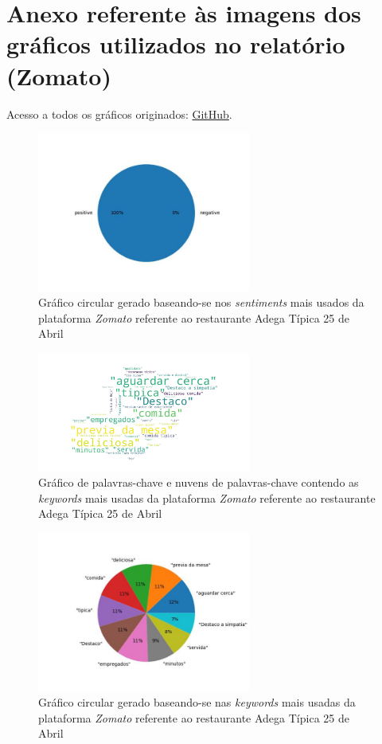 \chapter{Anexo referente às imagens dos gráficos utilizados no relatório (Zomato)}

Acesso a todos os gráficos originados: \href{https://github.com/CatKinKitKat/pi2021/tree/master/projecto/datascience/graphs/zomato/restaurantes}{GitHub}.

\label{an5}
\begin{figure}[!htb]
\centering
\includegraphics[width=7cm]{figuras/Zomato/Restaurants/restaurante0_sentiments.jpeg}
\caption{Gráfico circular gerado baseando-se nos \textit{sentiments} mais usados da plataforma \textit{Zomato} referente ao restaurante Adega Típica 25 de Abril}
\label{fig:exemplofig}
\end{figure}

\begin{figure}[!htb]
\centering
\includegraphics[width=7cm]{figuras/Zomato/Restaurants/restaurante0_keywordcloud.jpeg}
\caption{Gráfico de palavras-chave e nuvens de palavras-chave contendo as \textit{keywords} mais usadas da plataforma \textit{Zomato} referente ao restaurante Adega Típica 25 de Abril}
\label{fig:exemplofig}
\end{figure}

\begin{figure}[!htb]
\centering
\includegraphics[width=7cm]{figuras/Zomato/Restaurants/restaurante0_keywords.jpeg}
\caption{Gráfico circular gerado baseando-se nas \textit{keywords} mais usadas da plataforma \textit{Zomato} referente ao restaurante Adega Típica 25 de Abril}
\label{fig:exemplofig}
\end{figure}

